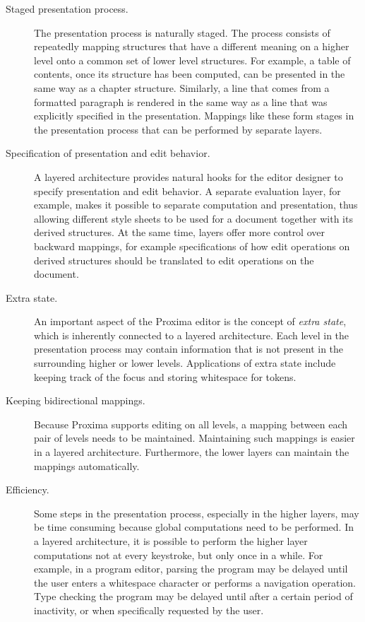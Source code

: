\begin{description}

\item[Staged presentation process.]
The presentation process is naturally staged. The process consists of repeatedly mapping  structures that have a different meaning on a higher level onto a common set of lower level structures. For example, a table of contents, once its structure has been computed, can be presented in the same way as a chapter structure. Similarly, a line that comes from a formatted paragraph is rendered in the same way as a line that was explicitly specified in the presentation. Mappings like these form stages in the presentation process that can be performed by separate layers.

\item[Specification of presentation and edit behavior.]
A layered architecture provides natural hooks for the editor designer to specify presentation and edit behavior. A separate evaluation layer, for example, makes it possible to separate computation and presentation, thus allowing different style sheets to be used for a document together with its derived structures. At the same time, layers offer more control over backward mappings, for example specifications of how edit operations on derived structures should be translated to edit operations on the document.

\item[Extra state.]
An important aspect of the Proxima editor is the concept of {\em extra state}, which is inherently connected to a layered architecture. Each level in the presentation process may contain information that is not present in the surrounding higher or lower levels. Applications of extra state include keeping track of the focus and storing whitespace for tokens. 

\item[Keeping bidirectional mappings.]
Because Proxima supports editing on all levels, a mapping between each pair of levels needs to be maintained. Maintaining such mappings is easier in a layered architecture. Furthermore, the lower layers can maintain the mappings automatically.

\item[Efficiency.]
Some steps in the presentation process, especially in the higher layers, may be time consuming because global computations need to be performed. In a layered architecture, it is possible to perform the higher layer computations not at every keystroke, but only once in a while. For example, in a program editor, parsing the program may be delayed until the user enters a whitespace character or performs a navigation operation. Type checking the program may be delayed until after a certain period of inactivity, or when specifically requested by the user.
\end{description}

